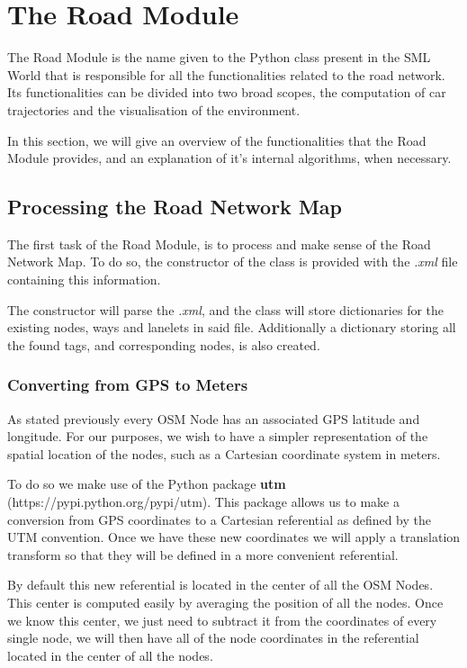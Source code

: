 
\section{The Road Module}
\label{sec:roadmodule}

The Road Module is the name given to the Python class present in the SML World that is responsible for all the functionalities related to the road network. Its functionalities can be divided into two broad scopes, the computation of car trajectories and the visualisation of the environment.

In this section, we will give an overview of the functionalities that the Road Module provides, and an explanation of it's internal algorithms, when necessary.

\subsection{Processing the Road Network Map}

The first task of the Road Module, is to process and make sense of the Road Network Map. To do so, the constructor of the class is provided with the \textit{.xml} file containing this information.

The constructor will parse the \textit{.xml}, and the class will store dictionaries for the existing nodes, ways and lanelets in said file. Additionally a dictionary storing all the found tags, and corresponding nodes, is also created.

\subsubsection{Converting from GPS to Meters}

As stated previously every OSM Node has an associated GPS latitude and longitude. For our purposes, we wish to have a simpler representation of the spatial location of the nodes, such as a Cartesian coordinate system in meters.

To do so we make use of the Python package \textbf{utm} (https://pypi.python.org/pypi/utm). This package allows us to make a conversion from GPS coordinates to a Cartesian referential as defined by the UTM convention. Once we have these new coordinates we will apply a translation transform so that they will be defined in a more convenient referential.

By default this new referential is located in the center of all the OSM Nodes. This center is computed easily by averaging the position of all the nodes. Once we know this center, we just need to subtract it from the coordinates of every single node, we will then have all of the node coordinates in the referential located in the center of all the nodes.

